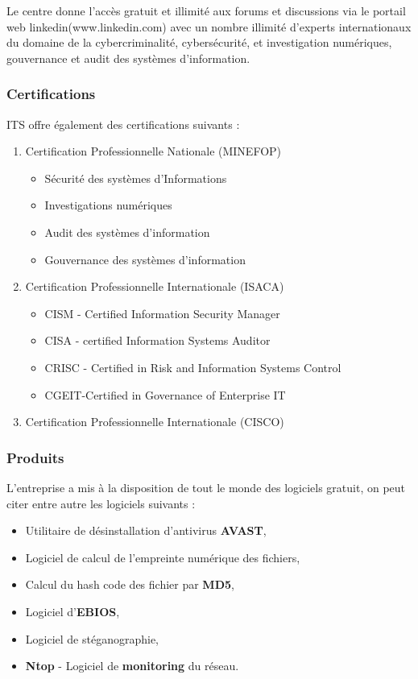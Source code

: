          Le centre donne l'accès gratuit et illimité aux forums et discussions via le portail web linkedin(www.linkedin.com) avec un nombre illimité d'experts internationaux du domaine de la cybercriminalité, cybersécurité, et investigation numériques, gouvernance et audit des systèmes d'information.
         
        		\subsubsection{Certifications}
        		
        		ITS offre également des certifications suivants :
        			\begin{enumerate}
        				\item Certification Professionnelle Nationale (MINEFOP)
        					\begin{itemize}
        						\item Sécurité des systèmes d’Informations
								\item Investigations numériques
								\item Audit des systèmes d’information
								\item Gouvernance des systèmes d’information
        					\end{itemize}
                		\item Certification Professionnelle Internationale (ISACA)
                			\begin{itemize}
                				\item CISM - Certified Information Security Manager
								\item CISA - certified Information Systems Auditor
								\item CRISC - Certified in Risk and Information Systems Control
								\item CGEIT-Certified in Governance of Enterprise IT
                			\end{itemize}
                		\item Certification Professionnelle Internationale (CISCO)
        			\end{enumerate}
				
				\subsubsection{Produits}
					L'entreprise a mis à la disposition de tout le monde des logiciels gratuit, on peut citer entre autre les logiciels suivants :
					\begin{itemize}
						\item Utilitaire de désinstallation d'antivirus \textbf{AVAST},
						\item Logiciel de calcul de l'empreinte numérique des fichiers,
						\item Calcul du hash code des fichier par \textbf{MD5},
						\item Logiciel d'\textbf{EBIOS},
						\item Logiciel de stéganographie,
						\item \textbf{Ntop} - Logiciel de \textbf{monitoring} du réseau.
					\end{itemize}
					
